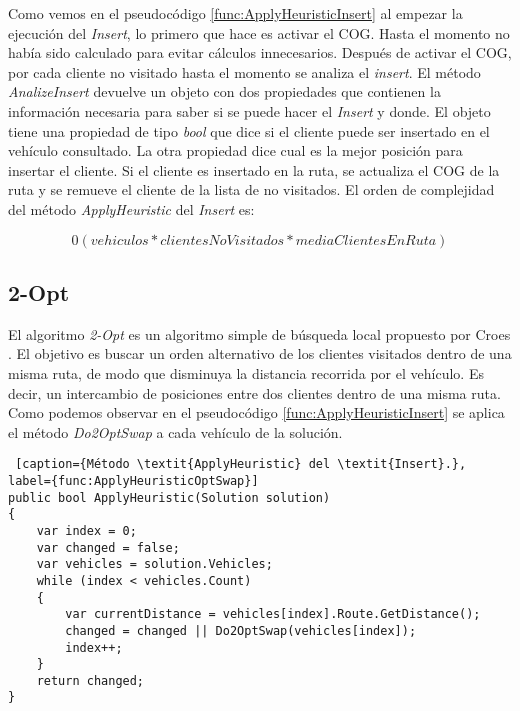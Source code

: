 \bigskip

Como vemos en el pseudocódigo \ref{func:ApplyHeuristicInsert} al empezar la ejecución del \textit{Insert}, lo primero que hace es activar el COG. Hasta el momento no había sido calculado para evitar cálculos innecesarios. Después de activar el COG, por cada cliente no visitado hasta el momento se analiza el \textit{insert}. El método \textit{AnalizeInsert} devuelve un objeto con dos propiedades que contienen la información necesaria para saber si se puede hacer el \textit{Insert} y donde. El objeto tiene una propiedad de tipo \textit{bool} que dice si el cliente puede ser insertado en el vehículo consultado. La otra propiedad dice cual es la mejor posición para insertar el cliente. Si el cliente es insertado en la ruta, se actualiza el COG de la ruta y se remueve el cliente de la lista de no visitados. El orden de complejidad del método \textit{ApplyHeuristic} del \textit{Insert} es: 

\begin{equation*}
0(vehiculos * clientesNoVisitados * mediaClientesEnRuta)
\end{equation*}

\subsection{2-Opt}

El algoritmo \textit{2-Opt} es un algoritmo simple de búsqueda local propuesto por Croes \cite{Croes}. El objetivo es buscar un orden alternativo de los clientes visitados dentro de una misma ruta, de modo que disminuya la distancia recorrida por el vehículo. Es decir, un intercambio de posiciones entre dos clientes dentro de una misma ruta. Como podemos observar en el pseudocódigo \ref{func:ApplyHeuristicInsert} se aplica el método \textit{Do2OptSwap} a cada vehículo de la solución.

\begin{minipage}{\textwidth}
\begin{lstlisting} [caption={Método \textit{ApplyHeuristic} del \textit{Insert}.}, label={func:ApplyHeuristicOptSwap}]
public bool ApplyHeuristic(Solution solution)
{
	var index = 0;
	var changed = false;	
	var vehicles = solution.Vehicles;	
	while (index < vehicles.Count)
	{
		var currentDistance = vehicles[index].Route.GetDistance();
		changed = changed || Do2OptSwap(vehicles[index]);
		index++;
	}
	return changed;
}
\end{lstlisting}
\end{minipage}

